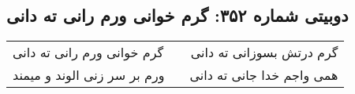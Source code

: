 \begin{center}
\section*{دوبیتی شماره ۳۵۲: گرم خوانی ورم رانی ته دانی}
\label{sec:352}
\begin{longtable}{l p{0.5cm} r}
گرم خوانی ورم رانی ته دانی
&&
گرم درتش بسوزانی ته دانی
\\
ورم بر سر زنی الوند و میمند
&&
همی واجم خدا جانی ته دانی
\\
\end{longtable}
\end{center}

